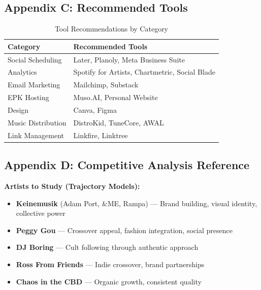 \documentclass[11pt,a4paper]{article}
\begin{document}
\subsection{Appendix C: Recommended Tools}

\begin{table}[h!]
\centering
\renewcommand{\arraystretch}{1.3}
\begin{tabularx}{\textwidth}{l X}
\toprule
\rowcolor{amaraprimary}
\textcolor{amaracream}{\textbf{Category}} & \textcolor{amaracream}{\textbf{Recommended Tools}} \\
\midrule
Social Scheduling & Later, Planoly, Meta Business Suite \\
Analytics & Spotify for Artists, Chartmetric, Social Blade \\
Email Marketing & Mailchimp, Substack \\
EPK Hosting & Muso.AI, Personal Website \\
Design & Canva, Figma \\
Music Distribution & DistroKid, TuneCore, AWAL \\
Link Management & Linkfire, Linktree \\
\bottomrule
\end{tabularx}
\caption{Tool Recommendations by Category}
\end{table}

\subsection{Appendix D: Competitive Analysis Reference}

\noindent\textbf{Artists to Study (Trajectory Models):}
\begin{itemize}[leftmargin=*]
    \item \textbf{Keinemusik} (Adam Port, \&ME, Rampa) --- Brand building, visual identity, collective power
    \item \textbf{Peggy Gou} --- Crossover appeal, fashion integration, social presence
    \item \textbf{DJ Boring} --- Cult following through authentic approach
    \item \textbf{Ross From Friends} --- Indie crossover, brand partnerships
    \item \textbf{Chaos in the CBD} --- Organic growth, consistent quality
\end{itemize}

\newpage
\end{document}
